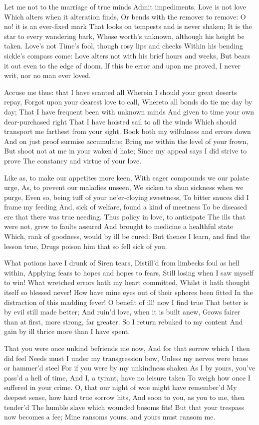 \documentclass[twocolumn]{book}
\begin{document}
Let me not to the marriage of true minds
Admit impediments. Love is not love
Which alters when it alteration finds,
Or bends with the remover to remove:
O no! it is an ever-fixed mark
That looks on tempests and is never shaken;
It is the star to every wandering bark,
Whose worth's unknown, although his height be taken.
Love's not Time's fool, though rosy lips and cheeks
\numerus*{}Within his bending sickle's compass come:
Love alters not with his brief hours and weeks,
But bears it out even to the edge of doom.
  If this be error and upon me proved,
  I never writ, nor no man ever loved.


Accuse me thus: that I have scanted all
Wherein I should your great deserts repay,
Forgot upon your dearest love to call,
Whereto all bonds do tie me day by day;
That I have frequent been with unknown minds
And given to time your own dear-purchased right
That I have hoisted sail to all the winds
Which should transport me farthest from your sight.
Book both my wilfulness and errors down
And on just proof surmise accumulate;
Bring me within the level of your frown,
But shoot not at me in your waken'd hate;
  Since my appeal says I did strive to prove
  The constancy and virtue of your love.


Like as, to make our appetites more keen,
With eager compounds we our palate urge,
As, to prevent our maladies unseen,
We sicken to shun sickness when we purge,
Even so, being tuff of your ne'er-cloying sweetness,
To bitter sauces did I frame my feeding
And, sick of welfare, found a kind of meetness
To be diseased ere that there was true needing.
Thus policy in love, to anticipate
The ills that were not, grew to faults assured
And brought to medicine a healthful state
Which, rank of goodness, would by ill be cured:
  But thence I learn, and find the lesson true,
  Drugs poison him that so fell sick of you.


What potions have I drunk of Siren tears,
Distill'd from limbecks foul as hell within,
Applying fears to hopes and hopes to fears,
Still losing when I saw myself to win!
What wretched errors hath my heart committed,
Whilst it hath thought itself so blessed never!
How have mine eyes out of their spheres been fitted
In the distraction of this madding fever!
O benefit of ill! now I find true
That better is by evil still made better;
And ruin'd love, when it is built anew,
Grows fairer than at first, more strong, far greater.
  So I return rebuked to my content
  And gain by ill thrice more than I have spent.


That you were once unkind befriends me now,
And for that sorrow which I then did feel
Needs must I under my transgression bow,
Unless my nerves were brass or hammer'd steel
For if you were by my unkindness shaken
As I by yours, you've pass'd a hell of time,
And I, a tyrant, have no leisure taken
To weigh how once I suffered in your crime.
O, that our night of woe might have remember'd
My deepest sense, how hard true sorrow hits,
And soon to you, as you to me, then tender'd
The humble slave which wounded bosoms fits!
  But that your trespass now becomes a fee;
  Mine ransoms yours, and yours must ransom me.
\end{document}
